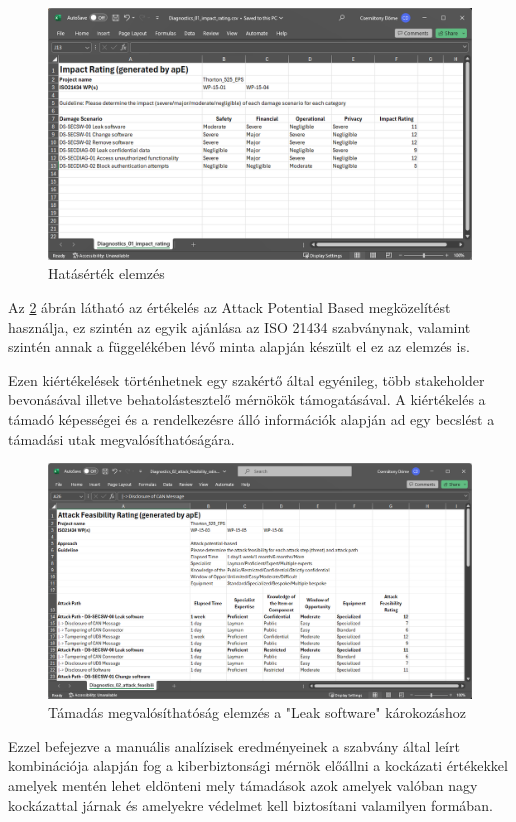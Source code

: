 \begin{figure}[!ht]
	\centering
	\includegraphics[width=120mm, keepaspectratio]{figures/ff_imprate.png}
	\caption{Hatásérték elemzés} 
	\label{fig:ff_imprate}
\end{figure}

Az \ref{fig:ff_attfeas} ábrán látható az értékelés az Attack Potential Based megközelítést használja, ez szintén az egyik ajánlása az ISO 21434 \cite{ISO21434} szabványnak, valamint szintén annak a függelékében lévő minta alapján készült el ez az elemzés is.

Ezen kiértékelések történhetnek egy szakértő által egyénileg, több stakeholder bevonásával illetve behatolástesztelő mérnökök támogatásával. A kiértékelés a támadó képességei és a rendelkezésre álló információk alapján ad egy becslést a támadási utak megvalósíthatóságára.

\begin{figure}[!ht]
	\centering
	\includegraphics[width=120mm, keepaspectratio]{figures/ff_attfeas.png}
	\caption{Támadás megvalósíthatóság elemzés a "Leak software" károkozáshoz} 
	\label{fig:ff_attfeas}
\end{figure}

Ezzel befejezve a manuális analízisek eredményeinek a szabvány által leírt kombinációja alapján fog a kiberbiztonsági mérnök előállni a kockázati értékekkel amelyek mentén lehet eldönteni mely támadások azok amelyek valóban nagy kockázattal járnak és amelyekre védelmet kell biztosítani valamilyen formában.